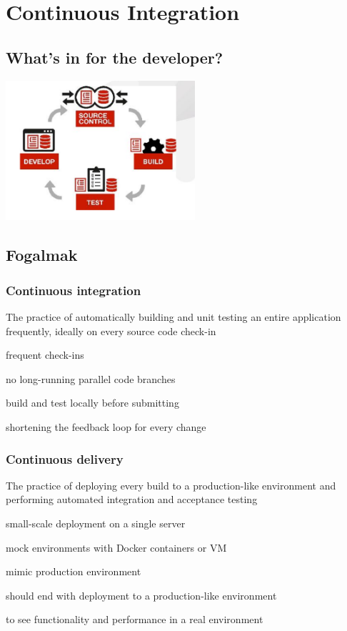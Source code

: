 \documentclass[a4paper,14pt, twocolumn]{extarticle}
\begin{document}
		
	\section{Continuous Integration}
		\subsection{What’s in for the developer?}
			\begin{center}
				\includegraphics[width=7cm]{ci1}
			\end{center}
		\subsection{Fogalmak}
			\subsubsection{Continuous integration}
				The practice of automatically building and unit testing an entire application frequently, ideally on every source code check-in
				\begin{compactitem}
					\item frequent check-ins 
					\item no long-running parallel code branches 
					\item build and test locally before submitting 
					\item shortening the feedback loop for every change
				\end{compactitem}
		\subsubsection{Continuous delivery}
			The practice of deploying every build to a production-like environment and performing automated integration and acceptance testing 
			\begin{compactitem}
				\item small-scale deployment on a single server 
				\item mock environments with Docker containers or VM 
				\item mimic production environment 
				\item should end with deployment to a production-like environment 
				\item to see functionality and performance in a real environment
			\end{compactitem}
\end{document}
